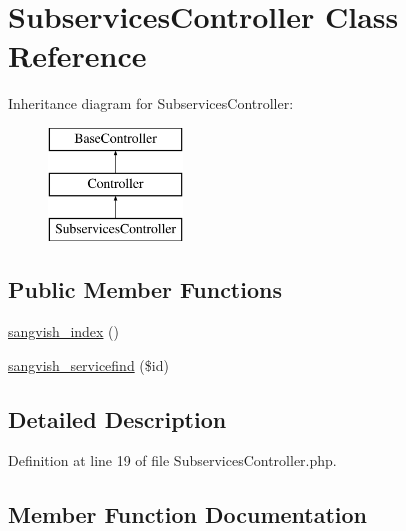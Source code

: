 \hypertarget{class_responsive_1_1_http_1_1_controllers_1_1_subservices_controller}{}\section{Subservices\+Controller Class Reference}
\label{class_responsive_1_1_http_1_1_controllers_1_1_subservices_controller}
Inheritance diagram for Subservices\+Controller\+:\begin{figure}[H]
\begin{center}
\leavevmode
\includegraphics[height=3.000000cm]{class_responsive_1_1_http_1_1_controllers_1_1_subservices_controller}
\end{center}
\end{figure}
\subsection*{Public Member Functions}
\begin{DoxyCompactItemize}
\item 
\mbox{\hyperlink{class_responsive_1_1_http_1_1_controllers_1_1_subservices_controller_a102ddc90c5f30fa7831dcf999b905ad1}{sangvish\+\_\+index}} ()
\item 
\mbox{\hyperlink{class_responsive_1_1_http_1_1_controllers_1_1_subservices_controller_aea162ead4cf81b3961ac8ccf4b1a5686}{sangvish\+\_\+servicefind}} (\$id)
\end{DoxyCompactItemize}


\subsection{Detailed Description}


Definition at line 19 of file Subservices\+Controller.\+php.



\subsection{Member Function Documentation}
\mbox{\label{class_responsive_1_1_http_1_1_controllers_1_1_subservices_controller_a102ddc90c5f30fa7831dcf999b905ad1}} 
